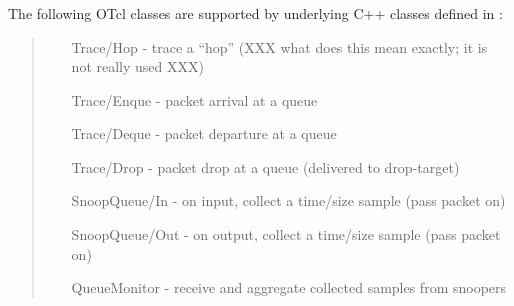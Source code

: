 \subsubsection{}
The following OTcl classes are supported by underlying C++
classes defined in :
\begin{quote}
\begin{itemize}
	\item [Trace/Hop] - trace a ``hop'' (XXX what does this mean exactly; it is not really used XXX)
	\item [Trace/Enque] - packet arrival at a queue
	\item [Trace/Deque] - packet departure at a queue
	\item [Trace/Drop] - packet drop at a queue (delivered to drop-target)
	\item [SnoopQueue/In] - on input, collect a time/size sample (pass packet on)
	\item [SnoopQueue/Out] - on output, collect a time/size sample (pass packet on)
	\item [QueueMonitor] - receive and aggregate collected samples from snoopers
\end{itemize}
\end{quote}

